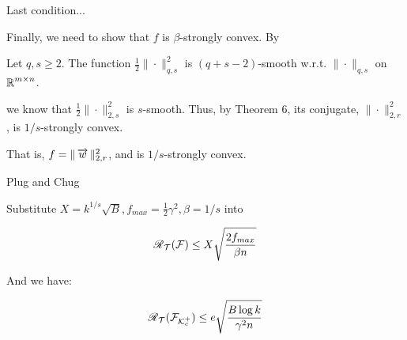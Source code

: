 \begin{frame}{Last condition...}

  Finally, we need to show that $f$ is $\beta$-strongly convex. By
  
  \begin{corollary}[19]
  Let $q,s \geq 2$. The function $\frac{1}{2}\|\cdot \|^2_{q,s}$ is $(q+s-2)$-smooth w.r.t. $\|\cdot \|_{q,s}$ on $\operatorname{\mathbb{R}}^{m \times n}$.
  \end{corollary}
  
  we know that $\frac{1}{2} \| \cdot \|^2_{2,s}$ is $s$-smooth. Thus, by Theorem 6, its conjugate, $\| \cdot \|_{2,r}^2$, is $1/s$-strongly convex. 

  \vspace*{0.5cm}
  
  That is, $f = \| \operatorname{\overrightarrow{w}}\|^2_{2,r}$, and is $1/s$-strongly convex.

  
\end{frame}


\begin{frame}{Plug and Chug}

  Substitute $X = k^{1/s}\sqrt{B}, f_{max} = \frac{1}{2}\gamma^2, \beta = 1/s$ into 

    \[ \operatorname{\mathscr{R}}_{\mathcal{T}}(\mathcal{F}) \leq X \sqrt{ \frac{2f_{max}}{\beta n}  } \]

    And we have:

    \[ \operatorname{\mathscr{R}}_{\mathcal{T}}(\mathcal{F}_{\mathcal{K}^+_c}) \leq e \sqrt{\frac{B \log k}{\gamma^2 n}} \]
    
\end{frame}
